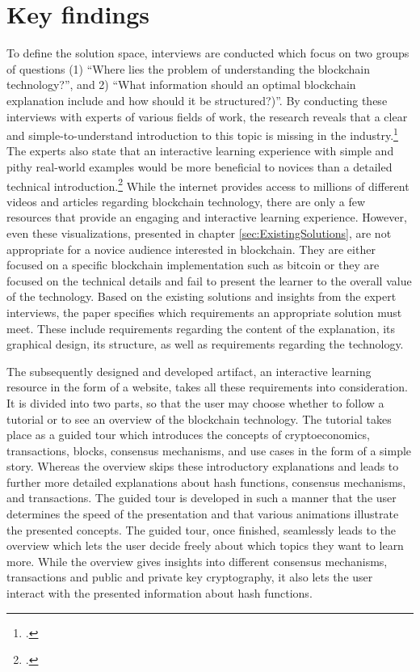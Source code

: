 \section{Key findings}
To define the solution space, interviews are conducted which focus on two groups of questions (1) \enquote{Where lies the problem of understanding the blockchain technology?}, and 2) \enquote{What information should an optimal blockchain explanation include and how should it be structured?)}.
By conducting these interviews with experts of various fields of work, the research reveals that a clear and simple-to-understand introduction to this topic is missing in the industry.\footcite[Cf.][]{DanielKaltenbach_Interview} The experts also state that an interactive learning experience with simple and pithy real-world examples would be more beneficial to novices than a detailed technical introduction.\footcite[Cf.][]{BjoernPaulewicz_Interview} While the internet provides access to millions of different videos and articles regarding blockchain technology, there are only a few resources that provide an engaging and interactive learning experience. However, even these visualizations, presented in chapter \ref{sec:ExistingSolutions}, are not appropriate for a novice audience interested in blockchain.  They are either focused on a specific blockchain implementation such as bitcoin or they are focused on the technical details and fail to present the learner to the overall value of the technology. Based on the existing solutions and insights from the expert interviews, the paper specifies which requirements an appropriate solution must meet. These include requirements regarding the content of the explanation, its graphical design, its structure, as well as requirements regarding the technology.

The subsequently designed and developed artifact, an interactive learning resource in the form of a website, takes all these requirements into consideration. It is divided into two parts, so that the user may choose whether to follow a tutorial or to see an overview of the blockchain technology. The tutorial takes place as a guided tour which introduces the concepts of cryptoeconomics, transactions, blocks, consensus mechanisms, and use cases in the form of a simple story. Whereas the overview skips these introductory explanations and leads to further more detailed explanations about hash functions, consensus mechanisms, and transactions. The guided tour is developed in such a manner that the user determines the speed of the presentation and that various animations illustrate the presented concepts. The guided tour, once finished, seamlessly leads to the overview which lets the user decide freely about which topics they want to learn more. While the overview gives insights into different consensus mechanisms, transactions and public and private key cryptography, it also lets the user interact with the presented information about hash functions.

